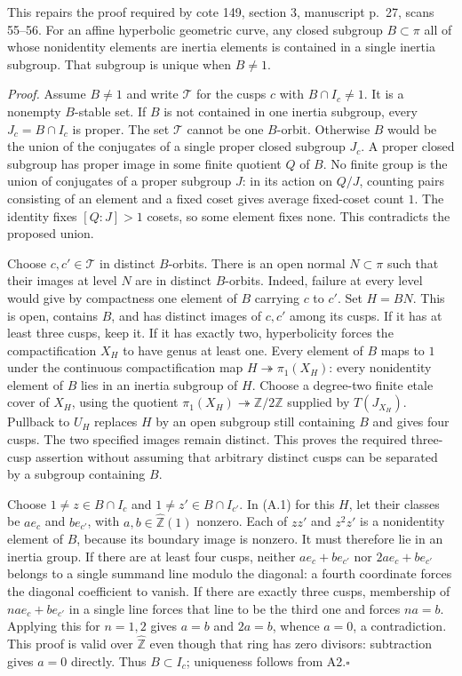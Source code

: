 \documentclass[11pt,a4paper]{article}
\begin{document}
This repairs the proof required by cote 149, section 3, manuscript p.~27, scans 55--56.
For an affine hyperbolic geometric curve, any closed subgroup $B\subset\pi$ all of whose nonidentity elements are inertia elements is contained in a single inertia subgroup. That subgroup is unique when $B\ne1$.

\emph{Proof.} Assume $B\ne1$ and write $\mathcal T$ for the cusps $c$ with $B\cap I_c\ne1$. It is a nonempty $B$-stable set. If $B$ is not contained in one inertia subgroup, every $J_c=B\cap I_c$ is proper. The set $\mathcal T$ cannot be one $B$-orbit. Otherwise $B$ would be the union of the conjugates of a single proper closed subgroup $J_c$. A proper closed subgroup has proper image in some finite quotient $Q$ of $B$. No finite group is the union of conjugates of a proper subgroup $J$: in its action on $Q/J$, counting pairs consisting of an element and a fixed coset gives average fixed-coset count $1$. The identity fixes $[Q:J]>1$ cosets, so some element fixes none. This contradicts the proposed union.

Choose $c,c'\in\mathcal T$ in distinct $B$-orbits. There is an open normal $N\subset\pi$ such that their images at level $N$ are in distinct $B$-orbits. Indeed, failure at every level would give by compactness one element of $B$ carrying $c$ to $c'$. Set $H=BN$. This is open, contains $B$, and has distinct images of $c,c'$ among its cusps. If it has at least three cusps, keep it. If it has exactly two, hyperbolicity forces the compactification $X_H$ to have genus at least one. Every element of $B$ maps to $1$ under the continuous compactification map $H\twoheadrightarrow\pi_1(X_H)$: every nonidentity element of $B$ lies in an inertia subgroup of $H$. Choose a degree-two finite etale cover of $X_H$, using the quotient $\pi_1(X_H)\twoheadrightarrow\mathbb Z/2\mathbb Z$ supplied by $T(J_{X_H})$. Pullback to $U_H$ replaces $H$ by an open subgroup still containing $B$ and gives four cusps. The two specified images remain distinct. This proves the required three-cusp assertion without assuming that arbitrary distinct cusps can be separated by a subgroup containing $B$.

Choose $1\ne z\in B\cap I_c$ and $1\ne z'\in B\cap I_{c'}$. In (A.1) for this $H$, let their classes be $a e_c$ and $b e_{c'}$, with $a,b\in\widehat{\mathbb Z}(1)$ nonzero. Each of $zz'$ and $z^2z'$ is a nonidentity element of $B$, because its boundary image is nonzero. It must therefore lie in an inertia group. If there are at least four cusps, neither $a e_c+b e_{c'}$ nor $2a e_c+b e_{c'}$ belongs to a single summand line modulo the diagonal: a fourth coordinate forces the diagonal coefficient to vanish. If there are exactly three cusps, membership of $n a e_c+b e_{c'}$ in a single line forces that line to be the third one and forces $na=b$. Applying this for $n=1,2$ gives $a=b$ and $2a=b$, whence $a=0$, a contradiction. This proof is valid over $\widehat{\mathbb Z}$ even though that ring has zero divisors: subtraction gives $a=0$ directly. Thus $B\subset I_c$; uniqueness follows from A2.\hfill$\square$
\end{document}
